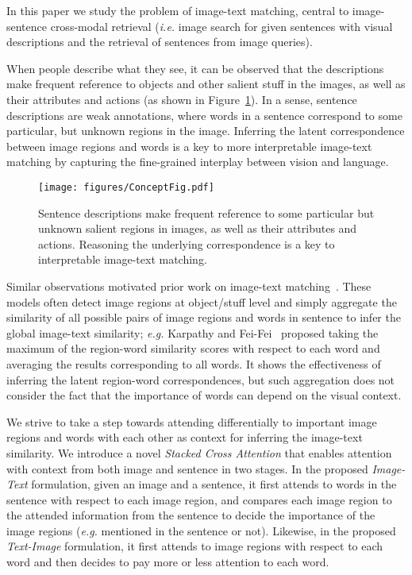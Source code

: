 \documentclass[runningheads]{llncs}
\begin{document}
In this paper we study the problem of image-text matching, central to image-sentence cross-modal retrieval ({\em i.e.} image search for given sentences with visual descriptions and the retrieval of sentences from image queries). 

When people describe what they see, it can be observed that the descriptions make frequent reference to objects and other salient stuff in the images, as well as their attributes and actions (as shown in Figure~\ref{fig:concept}). In a sense, sentence descriptions are weak annotations, where words in a sentence correspond to some particular, but unknown regions in the image. Inferring the latent correspondence between image regions and words is a key to more interpretable image-text matching by capturing the fine-grained interplay between vision and language.

\begin{figure}[t!]
\centering
\texttt{[image: figures/ConceptFig.pdf]}
\caption{Sentence descriptions make frequent reference to some particular but unknown salient regions in images, as well as their attributes and actions. Reasoning the underlying correspondence is a key to interpretable image-text matching.}
\label{fig:concept}
\end{figure}

Similar observations motivated prior work on image-text matching~\cite{karpathy2015deep,karpathy2014deep,niu2017hierarchical}. These models often detect image regions at object/stuff level and simply aggregate the similarity of all possible pairs of image regions and words in sentence to infer the global image-text similarity; {\em e.g.} Karpathy and Fei-Fei~\cite{karpathy2015deep} proposed taking the maximum of the region-word similarity scores with respect to each word and averaging the results corresponding to all words. It shows the effectiveness of inferring the latent region-word correspondences, but such aggregation does not consider the fact that the importance of words can depend on the visual context.  

We strive to take a step towards attending differentially to important image regions and words with each other as context for inferring the image-text similarity. We introduce a novel \textit{Stacked Cross Attention} that enables attention with context from both image and sentence in two stages. In the proposed \textit{Image-Text} formulation, given an image and a sentence, it first attends to words in the sentence with respect to each image region, and compares each image region to the attended information from the sentence to decide the importance of the image regions ({\em e.g.} mentioned in the sentence or not). Likewise, in the proposed \textit{Text-Image} formulation, it first attends to image regions with respect to each word and then decides to pay more or less attention to each word. 
\end{document}
